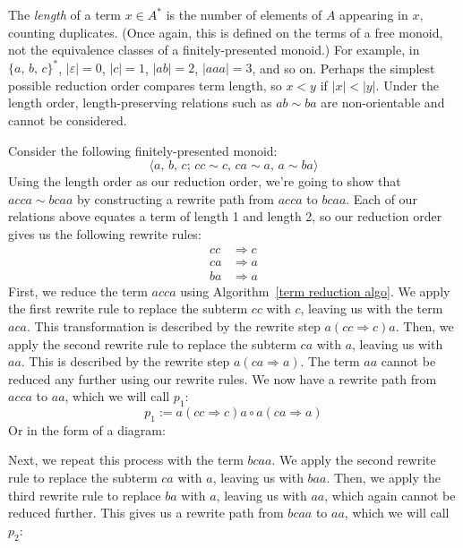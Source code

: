 \documentclass[../generics]{subfiles}
\begin{document}
\begin{definition}
The \emph{length} of a term $x\in A^*$ is the number of elements of $A$ appearing in $x$, counting duplicates. (Once again, this is defined on the terms of a free monoid, not the equivalence classes of a finitely-presented monoid.) For example, in $\{a,\,b,\,c\}^*$, $|\varepsilon|=0$, $|c|=1$, $|ab|=2$, $|aaa|=3$, and so on. Perhaps the simplest possible reduction order compares term length, so $x<y$ if $|x|<|y|$. Under the length order, length-preserving relations such as $ab\sim ba$ are non-orientable and cannot be considered.
\end{definition}
\begin{example} Consider the following finitely-presented monoid:
\[\langle a,\,b,\,c;\,cc\sim c,\,ca\sim a,\,a\sim ba\rangle\]
Using the length order as our reduction order, we're going to show that $acca\sim bcaa$ by constructing a rewrite path from $acca$ to $bcaa$. Each of our relations above equates a term of length 1 and length 2, so our reduction order gives us the following rewrite rules:
\begin{align*}
cc&\Rightarrow c\\
ca&\Rightarrow a\\
ba&\Rightarrow a
\end{align*}
First, we reduce the term $acca$ using Algorithm~\ref{term reduction algo}. We apply the first rewrite rule to replace the subterm $cc$ with $c$, leaving us with the term $aca$. This transformation is described by the rewrite step $a(cc\Rightarrow c)a$. Then, we apply the second rewrite rule to replace the subterm $ca$ with $a$, leaving us with $aa$. This is described by the rewrite step $a(ca\Rightarrow a)$. The term $aa$ cannot be reduced any further using our rewrite rules. We now have a rewrite path from $acca$ to $aa$, which we will call $p_1$:
\[p_1 := a(cc\Rightarrow c)a\circ a(ca\Rightarrow a)\]
Or in the form of a diagram:
\begin{quote}
\end{quote}
Next, we repeat this process with the term $bcaa$. We apply the second rewrite rule to replace the subterm $ca$ with $a$, leaving us with $baa$. Then, we apply the third rewrite rule to replace $ba$ with $a$, leaving us with $aa$, which again cannot be reduced further. This gives us a rewrite path from $bcaa$ to $aa$, which we will call $p_2$:

\end{example}
\end{document}
